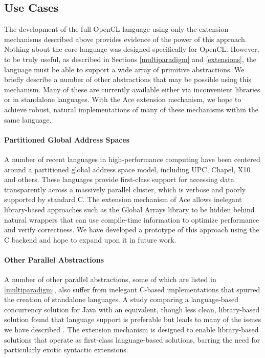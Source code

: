 \documentclass{sig-alternate}
\begin{document}
\subsection{Use Cases}
The development of the full OpenCL language using only the extension mechanisms described above provides evidence of the power of this approach. Nothing about the core language was designed specifically for OpenCL. However, to be truly useful, as described in Sections \ref{multiparadigm} and  \ref{extensions}, the language must be able to support a wide array of primitive abstractions. We briefly describe a number of other abstractions that may be possible using this mechanism. Many of these are currently available either via inconvenient libraries or in standalone languages. With the Ace extension mechanism, we hope to achieve robust, natural implementations of many of these mechanisms within the same language.

\paragraph{Partitioned Global Address Spaces}
A number of recent languages in high-performance computing have been centered around a partitioned global address space model, including UPC, Chapel, X10 and others. These languages provide first-class support for accessing data transparently across a massively parallel cluster, which is verbose and poorly supported by standard C. The extension mechanism of Ace allows inelegant library-based approaches such as the Global Arrays library to be hidden behind natural wrappers that can use compile-time information to optimize performance and verify correctness. We have developed a prototype of this approach using the C backend and hope to expand upon it in future work.

\paragraph{Other Parallel Abstractions}
A number of other parallel abstractions, some of which are listed in \ref{multiparadigm}, also suffer from inelegant C-based implementations that spurred the creation of standalone languages. A study comparing a language-based concurrency solution for Java with an equivalent, though less clean, library-based solution found that language support is preferable but leads to many of the issues we have described \cite{cave2010comparing}. The extension mechanism is designed to enable library-based solutions that operate as first-class language-based solutions, barring the need for particularly exotic syntactic extensions.
\end{document}
